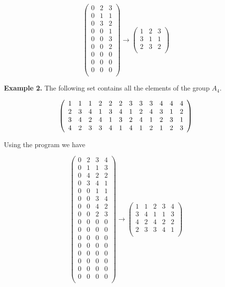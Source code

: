 \documentclass[12pt]{extarticle}
\begin{document}
$$\begin{pmatrix} 
  0 &  2 &  3 \\ 
  0 &  1 &  1 \\ 
  0 &  3 &  2 \\ 
  0 &  0 &  1 \\ 
  0 &  0 &  3 \\ 
  0 &  0 &  2 \\ 
  0 &  0 &  0 \\ 
  0 &  0 &  0 \\ 
  0 &  0 &  0 \\ 
\end{pmatrix}
\longrightarrow
\begin{pmatrix} 
  1 &  2 &  3 \\ 
  3 &  1 &  1 \\ 
  2 &  3 &  2 \\ 
\end{pmatrix} $$

\textbf{Example 2.} The following set contains all the elements of the group $A_4$. 

$$\left(\begin{array}{*{12}c}
1 &  1 &  1 &  2 &  2 &  2 &  3 &  3 &  3 &  4 &  4 &  4 \\ 
  2 &  3 &  4 &  1 &  3 &  4 &  1 &  2 &  4 &  3 &  1 &  2 \\ 
  3 &  4 &  2 &  4 &  1 &  3 &  2 &  4 &  1 &  2 &  3 &  1 \\ 
  4 &  2 &  3 &  3 &  4 &  1 &  4 &  1 &  2 &  1 &  2 &  3 \\ 
\end{array}\right)$$

Using the program we have

$$\begin{pmatrix} 
  0 &  2 &  3 &  4 \\ 
  0 &  1 &  1 &  3 \\ 
  0 &  4 &  2 &  2 \\ 
  0 &  3 &  4 &  1 \\ 
  0 &  0 &  1 &  1 \\ 
  0 &  0 &  3 &  4 \\ 
  0 &  0 &  4 &  2 \\ 
  0 &  0 &  2 &  3 \\ 
  0 &  0 &  0 &  0 \\ 
  0 &  0 &  0 &  0 \\ 
  0 &  0 &  0 &  0 \\ 
  0 &  0 &  0 &  0 \\ 
  0 &  0 &  0 &  0 \\ 
  0 &  0 &  0 &  0 \\ 
  0 &  0 &  0 &  0 \\ 
  0 &  0 &  0 &  0 \\ 
\end{pmatrix} 
\longrightarrow
\begin{pmatrix} 
  1 &  1 &  2 &  3 &  4 \\ 
  3 &  4 &  1 &  1 &  3 \\ 
  4 &  2 &  4 &  2 &  2 \\ 
  2 &  3 &  3 &  4 &  1 \\ 
\end{pmatrix} $$
\end{document}
